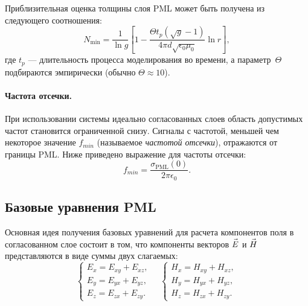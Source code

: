 \noindent
Приблизительная оценка толщины слоя PML может быть получена из следующего
соотношения:
\begin{equation}
\label{eq:hz1}
    N_\text{min}= \frac{1}{\ln g}
    \left[
        1 - \frac{\Theta t_p(\sqrt{g}-1)}{4\pi d \sqrt{\epsilon_0\mu_0}} \ln{r}
    \right],
\end{equation}
где $t_p$ --- длительность процесса моделирования во времени,
а параметр~$\Theta$ подбираются эмпирически (обычно $\Theta\approx10$).

\paragraph*{Частота отсечки.}
При использовании системы идеально согласованных слоев область допустимых частот
становится ограниченной снизу. Сигналы с частотой, меньшей чем некоторое
значение $f_{min}$ (называемое \emph{частотой отсечки}), отражаются от границы
PML. Ниже приведено выражение для частоты отсечки:
\begin{equation}
    \label{eq:PmlCutoffFrequency}
    f_{min} = \frac{\sigma_\text{PML}(0)}{2\pi\epsilon_0}.
\end{equation}


\subsection{Базовые уравнения PML}

Основная идея получения базовых уравнений для расчета компонентов поля
в согласованном слое состоит в том, что компоненты векторов $\vec{E\mathstrut}$
и $\vec{H\mathstrut}$ представляются в виде суммы двух слагаемых:
\begin{equation}
\label{eq:PmlSplitFieldEquations}
\left\{
    \begin{aligned}
        E_x = E_{xy}+E_{xz}, \\
        E_y = E_{yx}+E_{yz}, \\
        E_z = E_{zx}+E_{zy}.
    \end{aligned}
\right.\quad
\left\{
    \begin{aligned}
        H_x = H_{xy}+H_{xz}, \\
        H_y = H_{yx}+H_{yz}, \\
        H_z = H_{zx}+H_{zy}.
    \end{aligned}
\right.
\end{equation}


